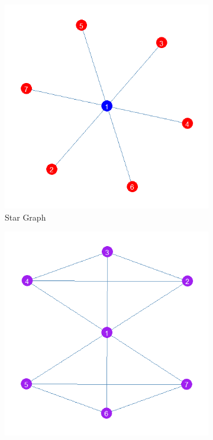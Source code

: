 \documentclass[12pt]{article}
\begin{document}
\begin{figure}[ht!]
    \captionsetup[subfigure]{font=footnotesize,labelfont=footnotesize}
    \centering
     \begin{subfigure}[b]{0.45\textwidth}
        \includegraphics[width=1.0\textwidth]{Plots/star.png}
            \caption{Star Graph}
            \label{fig:star}
    \end{subfigure}
     \begin{subfigure}[b]{0.45\textwidth}
        \includegraphics[width=1.0\textwidth]{Plots/sf.png}

\end{subfigure}
\end{figure}
\end{document}
